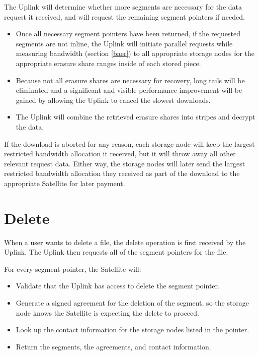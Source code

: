 \documentclass[8pt,fleqn,openany]{book}
\begin{document}
The Uplink will determine whether more segments are necessary for the
  data request it received, and will request the remaining segment pointers if needed.

\begin{itemize}
\item Once all necessary segment pointers have been returned, if the requested
  segments are not inline, the Uplink will initiate parallel requests
  while measuring bandwidth (section \ref{baer}) to all appropriate storage
  nodes for the appropriate erasure share ranges inside of each stored piece.
\item Because not all erasure shares are necessary for recovery, long tails
  will be eliminated and a significant and visible performance improvement will
  be gained by allowing the Uplink to cancel the slowest downloads.
\item The Uplink will combine the retrieved erasure shares into stripes and
  decrypt the data.
\end{itemize}

If the download is aborted for any reason, each storage node will keep the
  largest restricted bandwidth allocation it received, but it will throw away all
  other relevant request data.
Either way, the storage nodes will later send the largest restricted
  bandwidth allocation they received as part of the download to the appropriate
  Satellite for later payment.

\section{Delete}

When a user wants to delete a file, the delete operation is first received
by the Uplink. The Uplink then requests all of the segment pointers for the file.

For every segment pointer, the Satellite will:
  \begin{itemize}
  \item Validate that the Uplink has access to delete the segment pointer.
  \item Generate a signed agreement for the deletion of the segment, so the
    storage node knows the Satellite is expecting the delete to proceed.
  \item Look up the contact information for the storage nodes listed in the
  pointer.
  \item Return the segments, the agreements, and contact information.
  \end{itemize}
\end{document}
